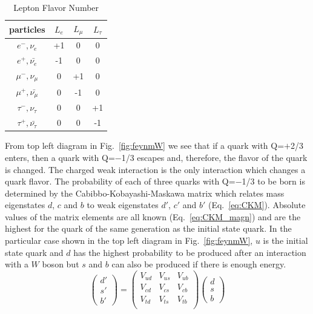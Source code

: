 \begin{table}[h]
  \begin{center}
  \caption{ Lepton Flavor Number}
  \vspace{5 mm}
  \begin{tabular}{|c|c|c|c|}
     \hline
     particles & $L_e$ & $L_{\mu}$ & $L_{\tau}$ \\ \hline
     $e^-,\nu_e$ &  +1  &  0  &  0  \\ \hline 
     $e^+, \bar{\nu_e}$ &  -1  &  0  &  0  \\ \hline 
     $\mu^-,\nu_{\mu}$ &  0  &  +1  &  0  \\ \hline 
     $\mu^+, \bar{\nu_{\mu}}$ &  0  &  -1  &  0  \\ \hline 
     $\tau^-,\nu_{\tau}$ &  0  &  0  &  +1  \\ \hline 
     $\tau^+, \bar{\nu_{\tau}}$ &  0  &  0  &  -1  \\ \hline 
  \end{tabular}
  \label{tab:LeptonFlavorNumber}
  \end{center}
\end{table}

From top left diagram in Fig.~\ref{fig:feynmW} we see that if a quark with Q=$+$2/3 enters, then a quark with Q=$-$1/3 escapes and, therefore, the flavor of the quark is changed. The charged weak interaction is the only interaction which changes a quark flavor. The probability of each of three quarks with Q=$-$1/3 to be born is determined by the Cabibbo-Kobayashi-Maskawa matrix which relates mass eigenstates $d$, $c$ and $b$ to weak eigenstates $d'$, $c'$ and $b'$ (Eq.~\ref{eq:CKM}). Absolute values of the matrix elements are all known (Eq.~\ref{eq:CKM_magn}) and are the highest for the quark of the same generation as the initial state quark. In the particular case shown in the top left diagram in Fig.~\ref{fig:feynmW}, $u$ is the initial state quark and $d$ has the highest probability to be produced after an interaction with a $W$ boson but $s$ and $b$ can also be produced if there is enough energy.\\

\begin{equation}\label{eq:CKM}
  \begin{pmatrix} d' \\ s' \\ b' \end{pmatrix}
     =
  \begin{pmatrix} 
     V_{ud} & V_{us} & V_{ub} \\
     V_{cd} & V_{cs} & V_{cb} \\
     V_{td} & V_{ts} & V_{tb} \\ 
  \end{pmatrix}
  \begin{pmatrix} d \\ s \\ b \end{pmatrix}
\end{equation}

